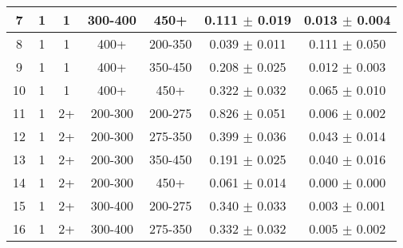 \begin{table}[htbp]
\begin{centering}
\begin{lrbox}{\closureBox}
\begin{tabular}{|c|c|c|c|c||c|c|}
              7 &               1 &               1 &         300-400 &            450+ &   0.111 $\pm$ 0.019 & 0.013 $\pm$ 0.004 \\
 \hline                                                                                      
              8 &               1 &               1 &            400+ &         200-350 &   0.039 $\pm$ 0.011 & 0.111 $\pm$ 0.050 \\
 \hline                                                                                      
              9 &               1 &               1 &            400+ &         350-450 &   0.208 $\pm$ 0.025 & 0.012 $\pm$ 0.003 \\
 \hline                                                                                      
             10 &               1 &               1 &            400+ &            450+ &   0.322 $\pm$ 0.032 & 0.065 $\pm$ 0.010 \\
 \hline                                                                                      
             11 &               1 &              2+ &         200-300 &         200-275 &   0.826 $\pm$ 0.051 & 0.006 $\pm$ 0.002 \\
 \hline                                                                                      
             12 &               1 &              2+ &         200-300 &         275-350 &   0.399 $\pm$ 0.036 & 0.043 $\pm$ 0.014 \\
 \hline                                                                                      
             13 &               1 &              2+ &         200-300 &         350-450 &   0.191 $\pm$ 0.025 & 0.040 $\pm$ 0.016 \\
 \hline                                                                                      
             14 &               1 &              2+ &         200-300 &            450+ &   0.061 $\pm$ 0.014 & 0.000 $\pm$ 0.000 \\
 \hline                                                                                      
             15 &               1 &              2+ &         300-400 &         200-275 &   0.340 $\pm$ 0.033 & 0.003 $\pm$ 0.001 \\
 \hline                                                                                      
             16 &               1 &              2+ &         300-400 &         275-350 &   0.332 $\pm$ 0.032 & 0.005 $\pm$ 0.002 \\
 \hline                                                                                      

\end{tabular}
\end{lrbox}
\end{centering}
\end{table}
